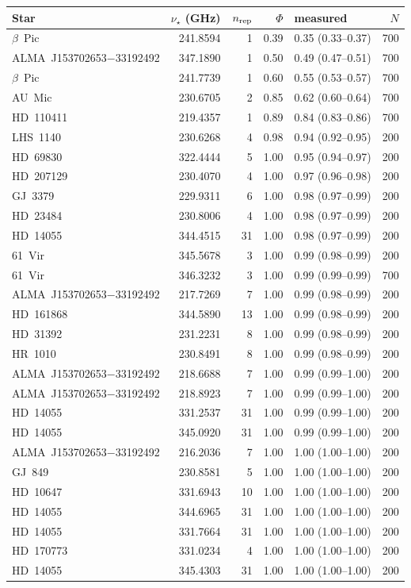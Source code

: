 \begin{tabular}{@{}l@{~~}r@{~~}r@{~~}r@{~~}l@{~~}r@{}}
\hline
Star & $\nu_\star$ (GHz) & $n_{\rm rep}$ & $\Phi$ & measured & $N$ \\
\hline
$\beta$~Pic & 241.8594 & 1 & 0.39 & 0.35 (0.33--0.37) & 700 \\
ALMA~J153702653$-$33192492 & 347.1890 & 1 & 0.50 & 0.49 (0.47--0.51) & 700 \\
$\beta$~Pic & 241.7739 & 1 & 0.60 & 0.55 (0.53--0.57) & 700 \\
AU~Mic & 230.6705 & 2 & 0.85 & 0.62 (0.60--0.64) & 700 \\
HD~110411 & 219.4357 & 1 & 0.89 & 0.84 (0.83--0.86) & 700 \\
LHS~1140 & 230.6268 & 4 & 0.98 & 0.94 (0.92--0.95) & 200 \\
HD~69830 & 322.4444 & 5 & 1.00 & 0.95 (0.94--0.97) & 200 \\
HD~207129 & 230.4070 & 4 & 1.00 & 0.97 (0.96--0.98) & 200 \\
GJ~3379 & 229.9311 & 6 & 1.00 & 0.98 (0.97--0.99) & 200 \\
HD~23484 & 230.8006 & 4 & 1.00 & 0.98 (0.97--0.99) & 200 \\
HD~14055 & 344.4515 & 31 & 1.00 & 0.98 (0.97--0.99) & 200 \\
61~Vir & 345.5678 & 3 & 1.00 & 0.99 (0.98--0.99) & 200 \\
61~Vir & 346.3232 & 3 & 1.00 & 0.99 (0.99--0.99) & 700 \\
ALMA~J153702653$-$33192492 & 217.7269 & 7 & 1.00 & 0.99 (0.98--0.99) & 200 \\
HD~161868 & 344.5890 & 13 & 1.00 & 0.99 (0.98--0.99) & 200 \\
HD~31392 & 231.2231 & 8 & 1.00 & 0.99 (0.98--0.99) & 200 \\
HR~1010 & 230.8491 & 8 & 1.00 & 0.99 (0.98--0.99) & 200 \\
ALMA~J153702653$-$33192492 & 218.6688 & 7 & 1.00 & 0.99 (0.99--1.00) & 200 \\
ALMA~J153702653$-$33192492 & 218.8923 & 7 & 1.00 & 0.99 (0.99--1.00) & 200 \\
HD~14055 & 331.2537 & 31 & 1.00 & 0.99 (0.99--1.00) & 200 \\
HD~14055 & 345.0920 & 31 & 1.00 & 0.99 (0.99--1.00) & 200 \\
ALMA~J153702653$-$33192492 & 216.2036 & 7 & 1.00 & 1.00 (1.00--1.00) & 200 \\
GJ~849 & 230.8581 & 5 & 1.00 & 1.00 (1.00--1.00) & 200 \\
HD~10647 & 331.6943 & 10 & 1.00 & 1.00 (1.00--1.00) & 200 \\
HD~14055 & 344.6965 & 31 & 1.00 & 1.00 (1.00--1.00) & 200 \\
HD~14055 & 331.7664 & 31 & 1.00 & 1.00 (1.00--1.00) & 200 \\
HD~170773 & 331.0234 & 4 & 1.00 & 1.00 (1.00--1.00) & 200 \\
HD~14055 & 345.4303 & 31 & 1.00 & 1.00 (1.00--1.00) & 200 \\
\hline
\end{tabular}
